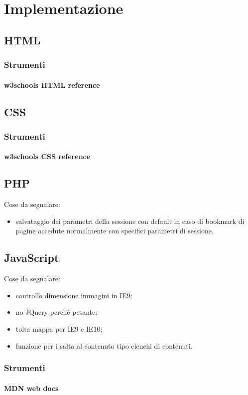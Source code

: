 \section{Implementazione}
\label{implementazione}

\subsection{HTML}
\label{implementazione-html}

\subsubsection{Strumenti}
\label{implementazione-html-strumenti}

\paragraph{w3schools HTML reference}
\label{implementazione-html-strumenti-w3schools-reference}


\subsection{CSS}
\label{implementazione-css}

\subsubsection{Strumenti}
\label{implementazione-css-strumenti}

\paragraph{w3schools CSS reference}
\label{implementazione-css-strumenti-w3schools-reference}

\subsection{PHP}
\label{implementazione-php}
Cose da segnalare:
\begin{itemize}
	\item salvataggio dei parametri della sessione con default in caso di bookmark di pagine accedute normalmente con specifici parametri di sessione.
\end{itemize}

\subsection{JavaScript}
\label{implementazione-javascript}
Cose da segnalare:
\begin{itemize}
	\item controllo dimensione immagini in IE9;
	\item no JQuery perché pesante;
	\item tolta mappa per IE9 e IE10;
	\item funzione per i salta al contenuto tipo elenchi di contenuti.
\end{itemize}

\subsubsection{Strumenti}
\label{implementazione-javascript-strumenti}

\paragraph{MDN web docs}
\label{implementazione-javascript-strumenti-mdn}